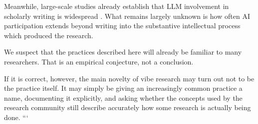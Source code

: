 Meanwhile, large-scale studies already establish that LLM involvement in scholarly writing is widespread \citep{liangEtAl2024mapping,kobakEtAl2024biomedical,gray2025prevalence}. What remains largely unknown is how often AI participation extends beyond writing into the substantive intellectual process which produced the research.

We suspect that the practices described here will already be familiar to many researchers. That is an empirical conjecture, not a conclusion.

If it is correct, however, the main novelty of vibe research may turn out not to be the practice itself. It may simply be giving an increasingly common practice a name, documenting it explicitly, and asking whether the concepts used by the research community still describe accurately how some research is actually being done.
```
